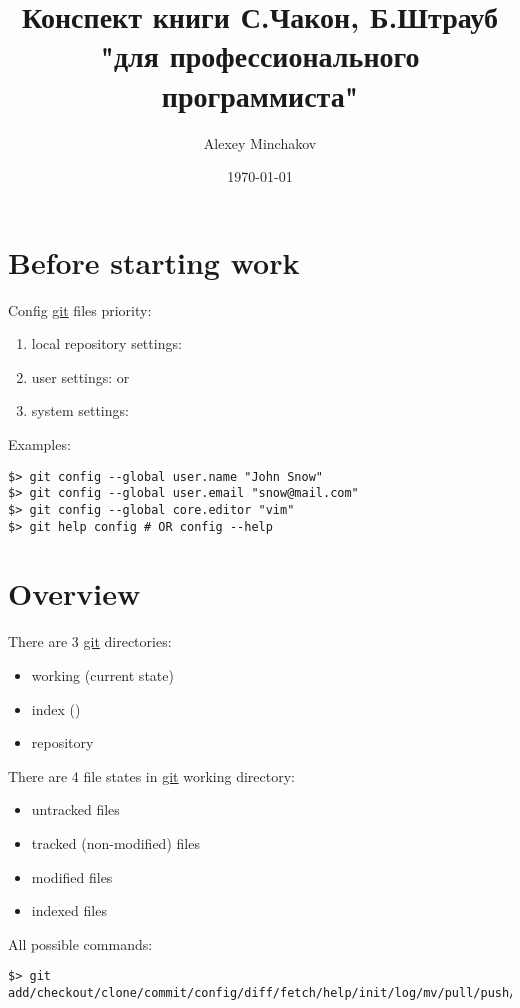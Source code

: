 \documentclass[a4paper, 12pt]{article}
\title{Конспект книги С.Чакон, Б.Штрауб "\git для профессионального программиста"}
\author{Alexey Minchakov}
\date{\today}
\newcommand{\git}{\url{git}\xspace}
\begin{document}
\maketitle

\section{Before starting work}

Config \git files priority:
\begin{enumerate}
\item local repository settings: 
\item user settings:  or 
\item system settings: 
\end{enumerate}

Examples:
\begin{lstlisting}
$> git config --global user.name "John Snow"
$> git config --global user.email "snow@mail.com"
$> git config --global core.editor "vim"
$> git help config # OR config --help
\end{lstlisting}

\section{Overview}

There are 3 \git directories:
\begin{itemize}
\item working (current state)
\item index ()
\item repository
\end{itemize}

There are 4 file states in \git working directory:
\begin{itemize}
\item untracked files
\item tracked (non-modified) files
\item modified files
\item indexed files
\end{itemize}

All possible commands:
\begin{lstlisting}
$> git add/checkout/clone/commit/config/diff/fetch/help/init/log/mv/pull/push/reset/remote/rm/status/tag
\end{lstlisting}
\end{document}
